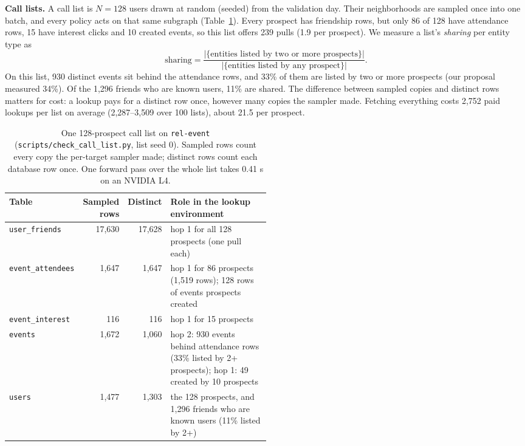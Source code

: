 \documentclass{article}
\begin{document}
\textbf{Call lists.} A call list is $N = 128$ users drawn at random (seeded) from the validation day. Their neighborhoods are sampled once into one batch, and every policy acts on that same subgraph (Table~\ref{tab:list}). Every prospect has friendship rows, but only 86 of 128 have attendance rows, 15 have interest clicks and 10 created events, so this list offers 239 pulls (1.9 per prospect). We measure a list's \emph{sharing} per entity type as
\begin{equation}
  \text{sharing} = \frac{\left|\{\text{entities listed by two or more prospects}\}\right|}{\left|\{\text{entities listed by any prospect}\}\right|}.
  \label{eq:sharing}
\end{equation}
On this list, 930 distinct events sit behind the attendance rows, and 33\% of them are listed by two or more prospects (our proposal measured 34\%). Of the 1,296 friends who are known users, 11\% are shared. The difference between sampled copies and distinct rows matters for cost: a lookup pays for a distinct row once, however many copies the sampler made. Fetching everything costs 2,752 paid lookups per list on average (2,287--3,509 over 100 lists), about 21.5 per prospect.

\begin{table}[h]
  \centering
  \small
  \begin{tabular}{@{}lrrp{0.5\linewidth}@{}}
    \toprule
    Table & Sampled rows & Distinct & Role in the lookup environment \\
    \midrule
    \texttt{user\_friends} & 17,630 & 17,628 & hop 1 for all 128 prospects (one pull each) \\
    \texttt{event\_attendees} & 1,647 & 1,647 & hop 1 for 86 prospects (1,519 rows); 128 rows of events prospects created \\
    \texttt{event\_interest} & 116 & 116 & hop 1 for 15 prospects \\
    \texttt{events} & 1,672 & 1,060 & hop 2: 930 events behind attendance rows (33\% listed by 2+ prospects); hop 1: 49 created by 10 prospects \\
    \texttt{users} & 1,477 & 1,303 & the 128 prospects, and 1,296 friends who are known users (11\% listed by 2+) \\
    \bottomrule
  \end{tabular}
  \caption{One 128-prospect call list on \texttt{rel-event} (\texttt{scripts/check\_call\_list.py}, list seed 0). Sampled rows count every copy the per-target sampler made; distinct rows count each database row once. One forward pass over the whole list takes 0.41 s on an NVIDIA L4.}
  \label{tab:list}
\end{table}
\end{document}
